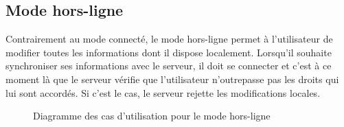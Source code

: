 \subsection{Mode hors-ligne}
Contrairement au mode connecté, le mode hors-ligne permet à l'utilisateur de modifier toutes les informations dont il dispose localement.
Lorsqu'il souhaite synchroniser ses informations avec le serveur, il doit se connecter et c'est à ce moment là que le serveur vérifie que l'utilisateur n'outrepasse pas les droits qui lui sont accordés.
Si c'est le cas, le serveur rejette les modifications locales.
\begin{figure}[htbp]
    \centering
	\caption{Diagramme des cas d'utilisation pour le mode hors-ligne}
	\label{ucmodedeco}
\end{figure}


